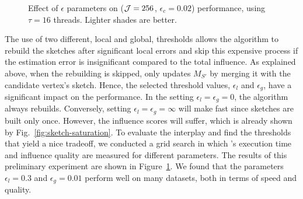 \begin{figure}[!ht]
\begin{center}
{        }
    \end{center}
    \caption{Effect of $\epsilon$ parameters on \acro(${\cal J} = 256$, $\epsilon_c=0.02$) performance, using $\tau=16$ threads. Lighter shades are better. }\label{fig:parameter-smallmultiples} 
\end{figure}    

The use of two different, local and global, thresholds allows the algorithm to rebuild the sketches after significant local errors and skip this expensive process if the estimation error is insignificant compared to the total influence. As explained above, when the rebuilding is skipped, \acro only updates $M_{S'}$ by merging it with the candidate vertex's sketch. Hence, the selected threshold values, $\epsilon_{l}$ and $\epsilon_{g}$, have a significant impact on the performance. In the setting $\epsilon_{l} = \epsilon_{g} = 0$, the algorithm always rebuilds. Conversely, setting $\epsilon_l = \epsilon_{g} = \infty$ will make \acro fast since sketches are built only once. However, the influence scores will suffer, which is already shown by Fig.~\ref{fig:sketch-saturation}. To evaluate the interplay and find the thresholds that yield a nice tradeoff, we conducted a grid search in which \acro's execution time and influence quality are measured for different parameters. The results of this preliminary experiment are shown in Figure~\ref{fig:parameter-smallmultiples}.  We found that the parameters $\epsilon_{l}=0.3$ and $\epsilon_{g}=0.01$ perform well on many datasets, both in terms of speed and quality. %


